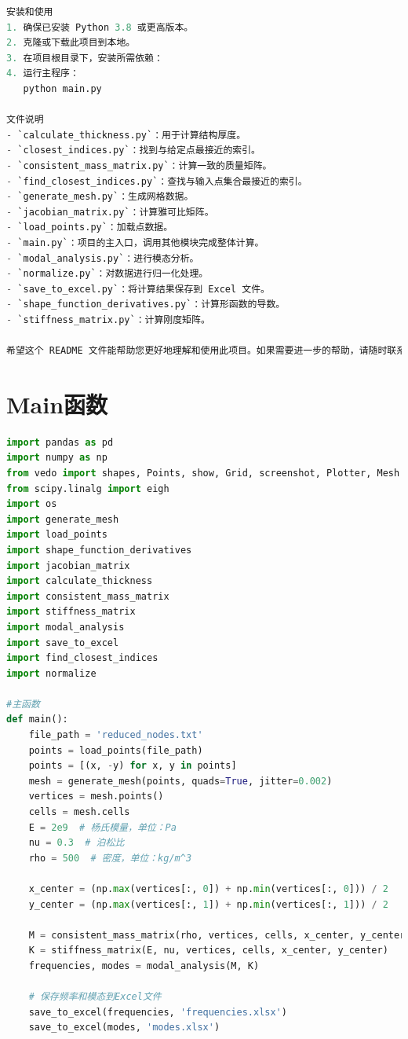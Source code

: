\documentclass[withoutpreface,bwprint]{cumcmthesis} %
\begin{document}
\begin{appendices}
\begin{lstlisting}[language=Python]
安装和使用
1. 确保已安装 Python 3.8 或更高版本。
2. 克隆或下载此项目到本地。
3. 在项目根目录下，安装所需依赖：
4. 运行主程序：
   python main.py

文件说明
- `calculate_thickness.py`：用于计算结构厚度。
- `closest_indices.py`：找到与给定点最接近的索引。
- `consistent_mass_matrix.py`：计算一致的质量矩阵。
- `find_closest_indices.py`：查找与输入点集合最接近的索引。
- `generate_mesh.py`：生成网格数据。
- `jacobian_matrix.py`：计算雅可比矩阵。
- `load_points.py`：加载点数据。
- `main.py`：项目的主入口，调用其他模块完成整体计算。
- `modal_analysis.py`：进行模态分析。
- `normalize.py`：对数据进行归一化处理。
- `save_to_excel.py`：将计算结果保存到 Excel 文件。
- `shape_function_derivatives.py`：计算形函数的导数。
- `stiffness_matrix.py`：计算刚度矩阵。

希望这个 README 文件能帮助您更好地理解和使用此项目。如果需要进一步的帮助，请随时联系。
\end{lstlisting}
\section{Main函数}\label{python}
\begin{lstlisting}[language=Python]
import pandas as pd
import numpy as np
from vedo import shapes, Points, show, Grid, screenshot, Plotter, Mesh
from scipy.linalg import eigh
import os
import generate_mesh
import load_points
import shape_function_derivatives
import jacobian_matrix
import calculate_thickness
import consistent_mass_matrix
import stiffness_matrix
import modal_analysis
import save_to_excel
import find_closest_indices
import normalize

#主函数
def main():
    file_path = 'reduced_nodes.txt'
    points = load_points(file_path)
    points = [(x, -y) for x, y in points]
    mesh = generate_mesh(points, quads=True, jitter=0.002)
    vertices = mesh.points()
    cells = mesh.cells
    E = 2e9  # 杨氏模量，单位：Pa
    nu = 0.3  # 泊松比
    rho = 500  # 密度，单位：kg/m^3

    x_center = (np.max(vertices[:, 0]) + np.min(vertices[:, 0])) / 2
    y_center = (np.max(vertices[:, 1]) + np.min(vertices[:, 1])) / 2

    M = consistent_mass_matrix(rho, vertices, cells, x_center, y_center)
    K = stiffness_matrix(E, nu, vertices, cells, x_center, y_center)
    frequencies, modes = modal_analysis(M, K)

    # 保存频率和模态到Excel文件
    save_to_excel(frequencies, 'frequencies.xlsx')
    save_to_excel(modes, 'modes.xlsx')


\end{lstlisting}
\end{appendices}
\end{document}
